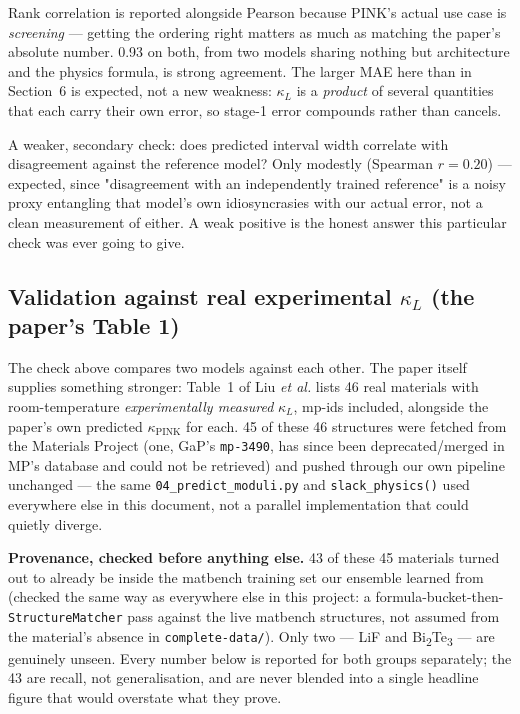 \documentclass[11pt,a4paper]{article}
\begin{document}
\noindent
Rank correlation is reported alongside Pearson because PINK's actual use case
is \emph{screening} --- getting the ordering right matters as much as matching
the paper's absolute number. 0.93 on both, from two models sharing nothing but
architecture and the physics formula, is strong agreement. The larger MAE here
than in Section~6 is expected, not a new weakness: $\kappa_L$ is a
\emph{product} of several quantities that each carry their own error, so
stage-1 error compounds rather than cancels.

A weaker, secondary check: does predicted interval width correlate with
disagreement against the reference model? Only modestly (Spearman
$r = 0.20$) --- expected, since "disagreement with an independently trained
reference" is a noisy proxy entangling that model's own idiosyncrasies with
our actual error, not a clean measurement of either. A weak positive is the
honest answer this particular check was ever going to give.

\subsection{Validation against real experimental $\kappa_L$ (the paper's Table 1)}

The check above compares two models against each other. The paper itself
supplies something stronger: Table~1 of Liu \textit{et al.} lists 46 real
materials with room-temperature \emph{experimentally measured} $\kappa_L$,
mp-ids included, alongside the paper's own predicted $\kappa_{\text{PINK}}$
for each. 45 of these 46 structures were fetched from the Materials Project
(one, GaP's \texttt{mp-3490}, has since been deprecated/merged in MP's
database and could not be retrieved) and pushed through our own pipeline
unchanged --- the same \texttt{04\_predict\_moduli.py} and
\texttt{slack\_physics()} used everywhere else in this document, not a
parallel implementation that could quietly diverge.

\textbf{Provenance, checked before anything else.} 43 of these 45 materials
turned out to already be inside the matbench training set our ensemble
learned from (checked the same way as everywhere else in this project: a
formula-bucket-then-\texttt{StructureMatcher} pass against the live matbench
structures, not assumed from the material's absence in
\texttt{complete-data/}). Only two --- LiF and
Bi\textsubscript{2}Te\textsubscript{3} --- are genuinely unseen. Every number
below is reported for both groups separately; the 43 are recall, not
generalisation, and are never blended into a single headline figure that
would overstate what they prove.
\end{document}
